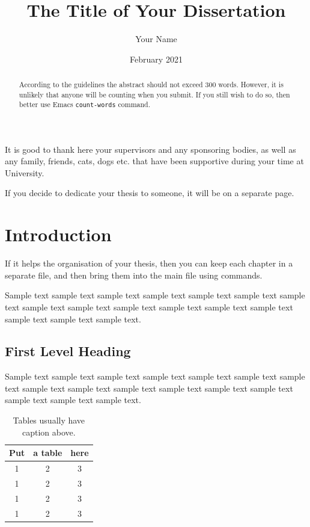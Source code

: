 \documentclass[11pt]{uonthesis}
\title{The Title of Your Dissertation}
\author{Your Name}
\date{February 2021}
\begin{document}
\begin{frontmatter}
\maketitle
\tableofcontents

\begin{abstract}
According to the guidelines the abstract should not exceed 300 words.
However, it is unlikely that anyone will be counting when you submit.
If you still wish to do so, then better use Emacs \verb|count-words|
command.
\end{abstract}

\begin{acknowledgements}
It is good to thank here your supervisors and any sponsoring bodies,
as well as any family, friends, cats, dogs etc. that have been
supportive during your time at University.
\end{acknowledgements}

\begin{dedication}
If you decide to dedicate your thesis to someone, it will be on a
separate page.
\end{dedication}

\end{frontmatter}

\chapter{Introduction}

If it helps the organisation of your thesis, then you can keep each
chapter in a separate file, and then bring them into the main 
file using \verb|| commands.

Sample text sample text sample text sample text sample text sample
text sample text sample text sample text sample text sample text
sample text sample text sample text sample text sample text.


\section{First Level Heading}

Sample text sample text sample text sample text sample text sample
text sample text sample text sample text sample text sample text
sample text sample text sample text sample text sample text.

\begin{table}
\caption{Tables usually have caption above.}
\centering
\begin{tabular}{c|cc}\hline\hline
Put & a table & here \\
\hline
1 & 2 & 3 \\
1 & 2 & 3 \\
1 & 2 & 3 \\
1 & 2 & 3
\end{tabular}
\end{table}
\end{document}
